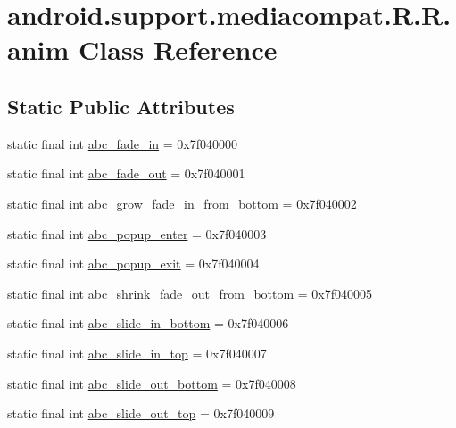 \hypertarget{classandroid_1_1support_1_1mediacompat_1_1_r_1_1anim}{
\section{android.support.mediacompat.R.R.anim Class Reference}
\label{classandroid_1_1support_1_1mediacompat_1_1_r_1_1anim}
}
\subsection*{Static Public Attributes}
\begin{CompactItemize}
\item 
static final int \hyperlink{classandroid_1_1support_1_1mediacompat_1_1_r_1_1anim_60295aed0cf7b634614a0db3ba27471a}{abc\_\-fade\_\-in} = 0x7f040000
\item 
static final int \hyperlink{classandroid_1_1support_1_1mediacompat_1_1_r_1_1anim_715eb554a88e90f5a9443b482771a0b6}{abc\_\-fade\_\-out} = 0x7f040001
\item 
static final int \hyperlink{classandroid_1_1support_1_1mediacompat_1_1_r_1_1anim_23f5ba415b735cd72c4eaaa98c4c9033}{abc\_\-grow\_\-fade\_\-in\_\-from\_\-bottom} = 0x7f040002
\item 
static final int \hyperlink{classandroid_1_1support_1_1mediacompat_1_1_r_1_1anim_7d355a86b10f16046323c5c31e0f5bea}{abc\_\-popup\_\-enter} = 0x7f040003
\item 
static final int \hyperlink{classandroid_1_1support_1_1mediacompat_1_1_r_1_1anim_42636d9de179afc6340eafdbe05bcf1d}{abc\_\-popup\_\-exit} = 0x7f040004
\item 
static final int \hyperlink{classandroid_1_1support_1_1mediacompat_1_1_r_1_1anim_813b566cdc88d1cefba254e9275d23ae}{abc\_\-shrink\_\-fade\_\-out\_\-from\_\-bottom} = 0x7f040005
\item 
static final int \hyperlink{classandroid_1_1support_1_1mediacompat_1_1_r_1_1anim_437c447aaef492f81baf2f5d03e7cf51}{abc\_\-slide\_\-in\_\-bottom} = 0x7f040006
\item 
static final int \hyperlink{classandroid_1_1support_1_1mediacompat_1_1_r_1_1anim_1d49d27b81b4d337819809165d890240}{abc\_\-slide\_\-in\_\-top} = 0x7f040007
\item 
static final int \hyperlink{classandroid_1_1support_1_1mediacompat_1_1_r_1_1anim_178a2b7070a288e6ee93106237c9291b}{abc\_\-slide\_\-out\_\-bottom} = 0x7f040008
\item 
static final int \hyperlink{classandroid_1_1support_1_1mediacompat_1_1_r_1_1anim_b485ec74df830fbe2f2ddd999fa8811c}{abc\_\-slide\_\-out\_\-top} = 0x7f040009

\end{CompactItemize}

